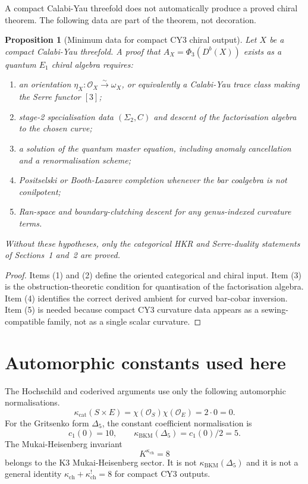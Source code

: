 \documentclass[11pt]{amsart}
\newtheorem{proposition}[theorem]{Proposition}
\newcommand{\kch}{\kappa_{\mathrm{ch}}}
\newcommand{\kcat}{\kappa_{\mathrm{cat}}}
\newcommand{\kBKM}{\kappa_{\mathrm{BKM}}}
\newcommand{\cO}{\mathcal{O}}
\newcommand{\Db}{D^{b}}
\begin{document}
A compact Calabi-Yau threefold does not automatically produce a proved
chiral theorem.  The following data are part of the theorem, not
decoration.

\begin{proposition}[Minimum data for compact CY3 chiral output]
\label{prop:compact-cy3-obligations}
Let $X$ be a compact Calabi-Yau threefold.  A proof that
$A_X=\Phi_3(\Db(X))$ exists as a quantum $E_1$ chiral algebra requires:
\begin{enumerate}
\item an orientation $\eta_X:\cO_X\xrightarrow{\sim}\omega_X$, or
equivalently a Calabi-Yau trace class making the Serre functor $[3]$;
\item stage-2 specialisation data $(\Sigma_2,C)$ and descent of the
factorisation algebra to the chosen curve;
\item a solution of the quantum master equation, including anomaly
cancellation and a renormalisation scheme;
\item Positselski or Booth-Lazarev completion whenever the bar
coalgebra is not conilpotent;
\item Ran-space and boundary-clutching descent for any genus-indexed
curvature terms.
\end{enumerate}
Without these hypotheses, only the categorical HKR and Serre-duality
statements of Sections~1 and~2 are proved.
\end{proposition}

\begin{proof}
Items (1) and (2) define the oriented categorical and chiral input.
Item (3) is the obstruction-theoretic condition for quantisation of the
factorisation algebra.  Item (4) identifies the correct derived ambient
for curved bar-cobar inversion.  Item (5) is needed because compact CY3
curvature data appears as a sewing-compatible family, not as a single
scalar curvature.
\end{proof}

\section{Automorphic constants used here}

The Hochschild and coderived arguments use only the following
automorphic normalisations.
\[
 \kcat(S\times E)
 =
 \chi(\cO_S)\chi(\cO_E)
 =
 2\cdot0
 =
 0.
\]
For the Gritsenko form $\Delta_5$, the constant coefficient
normalisation is
\[
 c_1(0)=10,\qquad
 \kBKM(\Delta_5)=c_1(0)/2=5.
\]
The Mukai-Heisenberg invariant
\[
 K^{\kch}=8
\]
belongs to the K3 Mukai-Heisenberg sector.  It is not
$\kBKM(\Delta_5)$ and it is not a general identity
$\kch+\kch^!=8$ for compact CY3 outputs.
\end{document}
